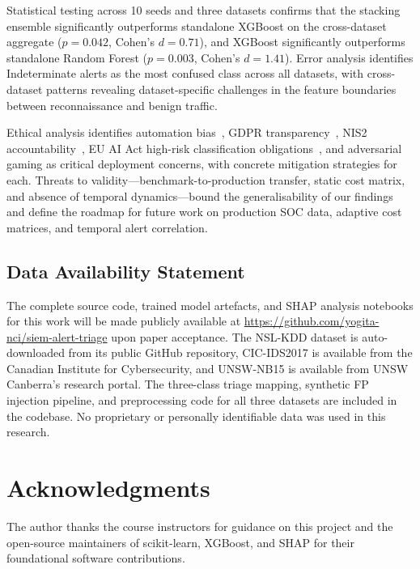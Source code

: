 \documentclass[conference]{IEEEtran}
\begin{document}
Statistical testing across 10 seeds and three datasets confirms that the stacking ensemble
significantly outperforms standalone XGBoost on the cross-dataset aggregate ($p=0.042$,
Cohen's $d=0.71$), and XGBoost significantly outperforms standalone Random Forest
($p=0.003$, Cohen's $d=1.41$).
Error analysis identifies Indeterminate alerts as the most confused class across all
datasets, with cross-dataset patterns revealing dataset-specific challenges in the
feature boundaries between reconnaissance and benign traffic.

Ethical analysis identifies automation bias~\cite{parasuraman1997}, GDPR
transparency~\cite{gdpr2016}, NIS2 accountability~\cite{nis2directive}, EU AI Act
high-risk classification obligations~\cite{euaiact2024}, and adversarial gaming as
critical deployment concerns, with concrete mitigation strategies for each.
Threats to validity---benchmark-to-production transfer, static cost matrix, and
absence of temporal dynamics---bound the generalisability of our findings and
define the roadmap for future work on production SOC data, adaptive cost matrices,
and temporal alert correlation.

\subsection*{Data Availability Statement}
The complete source code, trained model artefacts, and SHAP analysis notebooks
for this work will be made publicly available at
\url{https://github.com/yogita-nci/siem-alert-triage} upon paper acceptance.
The NSL-KDD dataset is auto-downloaded from its public GitHub repository,
CIC-IDS2017 is available from the Canadian Institute for Cybersecurity,
and UNSW-NB15 is available from UNSW Canberra's research portal.
The three-class triage mapping, synthetic FP injection pipeline, and preprocessing
code for all three datasets are included in the codebase. No proprietary or
personally identifiable data was used in this research.

\section*{Acknowledgments}
The author thanks the course instructors for guidance on this project and the open-source
maintainers of scikit-learn, XGBoost, and SHAP for their foundational software contributions.




\balance
\end{document}
